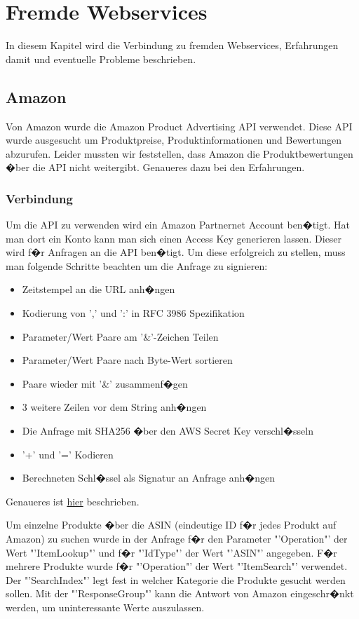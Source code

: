 \chapter{Fremde Webservices}
In diesem Kapitel wird die Verbindung zu fremden Webservices, Erfahrungen damit und eventuelle Probleme beschrieben.

\section{Amazon}
Von Amazon wurde die Amazon Product Advertising API verwendet. Diese API wurde ausgesucht um Produktpreise, Produktinformationen und Bewertungen abzurufen. Leider mussten wir feststellen, dass Amazon die Produktbewertungen �ber die API nicht weitergibt. Genaueres dazu bei den Erfahrungen.

\subsection{Verbindung}
Um die API zu verwenden wird ein Amazon Partnernet Account ben�tigt. Hat man dort ein Konto kann man sich einen Access Key generieren lassen. Dieser wird f�r Anfragen an die API ben�tigt. Um diese erfolgreich zu stellen, muss man folgende Schritte beachten um die Anfrage zu signieren:

\begin{itemize}
	\item Zeitstempel an die URL anh�ngen
	\item Kodierung von ',' und ':' in RFC 3986 Spezifikation
	\item Parameter/Wert Paare am '\&'-Zeichen Teilen
	\item Parameter/Wert Paare nach Byte-Wert sortieren
	\item Paare wieder mit '\&' zusammenf�gen
	\item 3 weitere Zeilen vor dem String anh�ngen
	\item Die Anfrage mit SHA256 �ber den AWS Secret Key verschl�sseln
	\item '+' und '=' Kodieren
	\item Berechneten Schl�ssel als Signatur an Anfrage anh�ngen
\end{itemize}
Genaueres ist \href{https://docs.aws.amazon.com/AWSECommerceService/latest/DG/rest-signature.html}{hier} beschrieben.

Um einzelne Produkte �ber die ASIN (eindeutige ID f�r jedes Produkt auf Amazon) zu suchen wurde in der Anfrage f�r den Parameter "'Operation"' der Wert "'ItemLookup"' und f�r "'IdType"' der Wert "'ASIN"' angegeben. F�r mehrere Produkte wurde f�r "'Operation"' der Wert "'ItemSearch"' verwendet. Der "'SearchIndex"' legt fest in welcher Kategorie die Produkte gesucht werden sollen. Mit der "'ResponseGroup"' kann die Antwort von Amazon eingeschr�nkt werden, um uninteressante Werte auszulassen.

